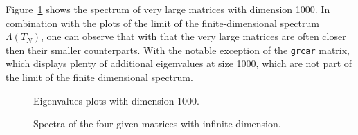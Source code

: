 Figure~\ref{fig:Task3No3} shows the spectrum of very large matrices with dimension 1000. In combination with the plots of the limit of the finite-dimensional spectrum $\Lambda(T_N)$, one can observe that with that the very large matrices are often closer then their smaller counterparts. With the notable exception of the \texttt{grcar} matrix, which displays plenty of additional eigenvalues at size 1000, which are not part of the limit of the finite dimensional spectrum.
\begin{figure}
\centering
\tikzset{mark size=1}





\caption{Eigenvalues plots with dimension 1000.}
\label{fig:Task3No3}
\end{figure}
\begin{figure}
\tikzset{mark size=1}




\caption{Spectra of the four given matrices with infinite dimension.}
\label{fig:inftySpec}
\end{figure}

